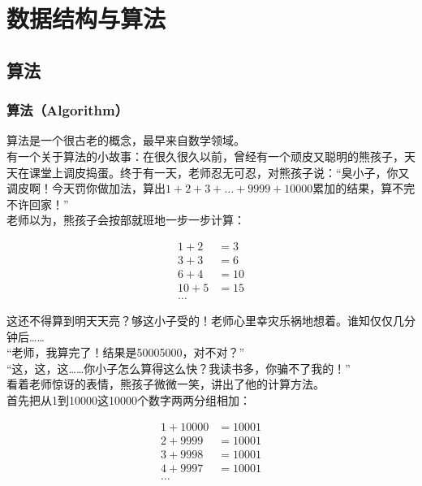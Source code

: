 \chapter{数据结构与算法}

\section{算法}

\subsection{算法（Algorithm）}

算法是一个很古老的概念，最早来自数学领域。 \\

有一个关于算法的小故事：在很久很久以前，曾经有一个顽皮又聪明的熊孩子，天天在课堂上调皮捣蛋。终于有一天，老师忍无可忍，对熊孩子说：“臭小子，你又调皮啊！今天罚你做加法，算出$ 1 + 2 + 3 + \dots + 9999 + 10000 $累加的结果，算不完不许回家！”  \\

老师以为，熊孩子会按部就班地一步一步计算：

\vspace{-1cm}

\begin{align*}
	1 + 2  & = 3  \\
	3 + 3  & = 6  \\
	6 + 4  & = 10 \\
	10 + 5 & = 15 \\
	\dots
\end{align*}

这还不得算到明天天亮？够这小子受的！老师心里幸灾乐祸地想着。谁知仅仅几分钟后…… \\

“老师，我算完了！结果是50005000，对不对？” \\

“这，这，这……你小子怎么算得这么快？我读书多，你骗不了我的！” \\

看着老师惊讶的表情，熊孩子微微一笑，讲出了他的计算方法。 \\

首先把从1到10000这10000个数字两两分组相加：

\vspace{-1cm}

\begin{align*}
	1 + 10000 & = 10001 \\
	2 + 9999  & = 10001 \\
	3 + 9998  & = 10001 \\
	4 + 9997  & = 10001 \\
	\dots
\end{align*}

